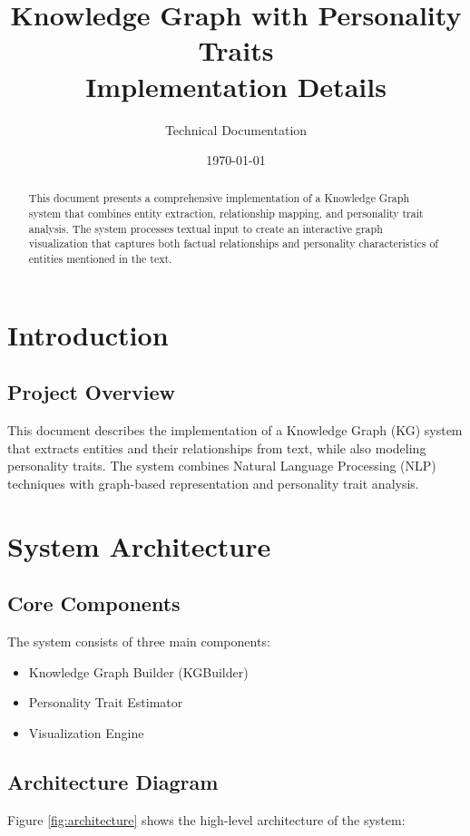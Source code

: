 \documentclass[11pt]{article}
\title{Knowledge Graph with Personality Traits\\Implementation Details}
\author{Technical Documentation}
\date{\today}
\begin{document}
\pagestyle{fancy}
\fancyhf{}

\maketitle

\begin{abstract}
This document presents a comprehensive implementation of a Knowledge Graph system that combines entity extraction, relationship mapping, and personality trait analysis. The system processes textual input to create an interactive graph visualization that captures both factual relationships and personality characteristics of entities mentioned in the text.
\end{abstract}

\tableofcontents
\newpage

\section{Introduction}
\subsection{Project Overview}
This document describes the implementation of a Knowledge Graph (KG) system that extracts entities and their relationships from text, while also modeling personality traits. The system combines Natural Language Processing (NLP) techniques with graph-based representation and personality trait analysis.

\section{System Architecture}

\subsection{Core Components}
The system consists of three main components:
\begin{itemize}
    \item Knowledge Graph Builder (KGBuilder)
    \item Personality Trait Estimator
    \item Visualization Engine
\end{itemize}

\subsection{Architecture Diagram}
Figure \ref{fig:architecture} shows the high-level architecture of the system:
\end{document}
